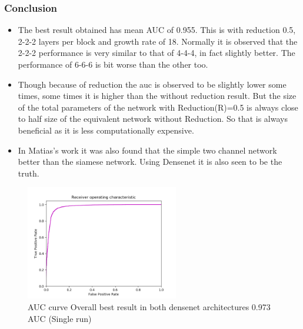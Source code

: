 
\subsubsection{Conclusion}

\begin{itemize}
 \item The best result obtained has mean AUC of 0.955. This is with reduction 0.5, 2-2-2 layers per block and growth rate of 18. Normally it is observed that the 2-2-2 performance
 is very similar to that of 4-4-4, in fact slightly better. The performance of 6-6-6 is bit worse than the other too. 
 \item Though because of reduction the auc is observed to be slightly lower some times, some times it is higher than the without reduction result. But the size of the total parameters 
 of the network with Reduction(R)=0.5 is always close to half size of the equivalent network without Reduction. So that is always beneficial as it is less computationally expensive.
 \item In Matias's work it was also found that the simple two channel network better than the siamese network. Using Densenet it is also seen to be the truth.
\end{itemize}

\begin{figure}[ht]
\centering
\includegraphics[height= 5cm]{images/densenet/densenet_two_channel_ninetysevenAUC}
\caption{AUC curve Overall best result in both densenet architectures 0.973 AUC (Single run)}
\label{fig:densenet_two_channel_ninetysevenAUC}
\end{figure}


